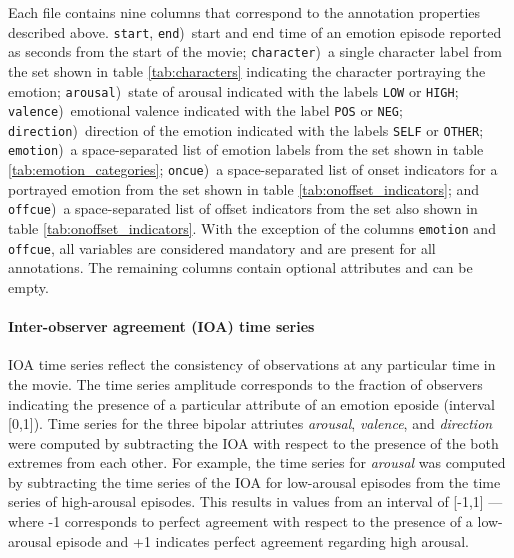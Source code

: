 \documentclass[10pt,a4paper,twocolumn]{article}
\begin{document}
Each file contains nine columns that correspond to the annotation properties
described above. \texttt{start}, \texttt{end})~start and end time of an emotion
episode reported as seconds from the start of the movie; \texttt{character})~a
single character label from the set shown in table \ref{tab:characters}
indicating the character portraying the emotion; \texttt{arousal})~state of
arousal indicated with the labels \texttt{LOW} or \texttt{HIGH};
\texttt{valence})~emotional valence indicated with the label \texttt{POS} or
\texttt{NEG}; \texttt{direction})~direction of the emotion indicated with the
labels \texttt{SELF} or \texttt{OTHER}; \texttt{emotion})~a space-separated list
of emotion labels from the set shown in table \ref{tab:emotion_categories};
\texttt{oncue})~a space-separated list of onset indicators for a portrayed
emotion from the set shown in table \ref{tab:onoffset_indicators}; and
\texttt{offcue})~a space-separated list of offset indicators from the set also
shown in table \ref{tab:onoffset_indicators}. With the exception of the
columns \texttt{emotion} and \texttt{offcue}, all variables are considered
mandatory and are present for all annotations. The remaining columns contain
optional attributes and can be empty.

\paragraph{Inter-observer agreement (IOA) time series} IOA time series reflect
the consistency of observations at any particular time in the movie. The time
series amplitude corresponds to the fraction of observers indicating the
presence of a particular attribute of an emotion eposide (interval [0,1]). Time
series for the three bipolar attriutes \textit{arousal}, \textit{valence}, and
\textit{direction} were computed by subtracting the IOA with respect to the
presence of the both extremes from each other. For example, the time series
for \textit{arousal} was computed by subtracting the time series of the IOA for
low-arousal episodes from the time series of high-arousal episodes. This
results in values from an interval of [-1,1] --- where -1 corresponds to perfect
agreement with respect to the presence of a low-arousal episode and +1 indicates
perfect agreement regarding high arousal.
\end{document}
